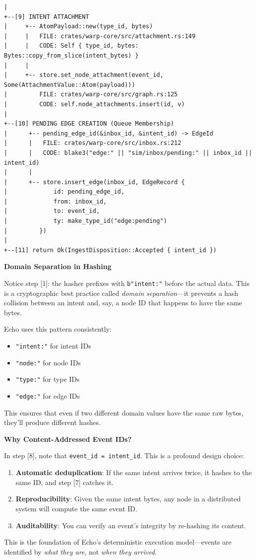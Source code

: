 \begin{lstlisting}[style=callgraph]
|
+--[9] INTENT ATTACHMENT
|     +-- AtomPayload::new(type_id, bytes)
|     |   FILE: crates/warp-core/src/attachment.rs:149
|     |   CODE: Self { type_id, bytes: Bytes::copy_from_slice(intent_bytes) }
|     |
|     +-- store.set_node_attachment(event_id, Some(AttachmentValue::Atom(payload)))
|         FILE: crates/warp-core/src/graph.rs:125
|         CODE: self.node_attachments.insert(id, v)
|
+--[10] PENDING EDGE CREATION (Queue Membership)
|      +-- pending_edge_id(&inbox_id, &intent_id) -> EdgeId
|      |   FILE: crates/warp-core/src/inbox.rs:212
|      |   CODE: blake3("edge:" || "sim/inbox/pending:" || inbox_id || intent_id)
|      |
|      +-- store.insert_edge(inbox_id, EdgeRecord {
|             id: pending_edge_id,
|             from: inbox_id,
|             to: event_id,
|             ty: make_type_id("edge:pending")
|         })
|
+--[11] return Ok(IngestDisposition::Accepted { intent_id })
\end{lstlisting}

\begin{cleverpattern}
\textbf{Domain Separation in Hashing}

Notice step [1]: the hasher prefixes with \texttt{b"intent:"} before the actual data. This is a cryptographic best practice called \emph{domain separation}---it prevents a hash collision between an intent and, say, a node ID that happens to have the same bytes.

Echo uses this pattern consistently:
\begin{itemize}
  \item \texttt{"intent:"} for intent IDs
  \item \texttt{"node:"} for node IDs
  \item \texttt{"type:"} for type IDs
  \item \texttt{"edge:"} for edge IDs
\end{itemize}

This ensures that even if two different domain values have the same raw bytes, they'll produce different hashes.
\end{cleverpattern}

\begin{deepdive}
\textbf{Why Content-Addressed Event IDs?}

In step [8], note that \texttt{event\_id = intent\_id}. This is a profound design choice:

\begin{enumerate}
  \item \textbf{Automatic deduplication}: If the same intent arrives twice, it hashes to the same ID, and step [7] catches it.
  \item \textbf{Reproducibility}: Given the same intent bytes, any node in a distributed system will compute the same event ID.
  \item \textbf{Auditability}: You can verify an event's integrity by re-hashing its content.
\end{enumerate}

This is the foundation of Echo's deterministic execution model---events are identified by \emph{what they are}, not \emph{when they arrived}.
\end{deepdive}


